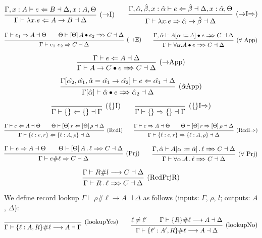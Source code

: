 \documentclass{article}
\renewcommand{\implies}{\Rightarrow}
\newcommand{\synthesizes}{\Rightarrow \!\!\! \Rightarrow}
\newcommand{\app}{\bullet}
\newcommand{\prjSymbol}{.}
\newcommand{\prj}{\,\prjSymbol\,}
\newcommand{\ev}{\hat}
\newcommand{\spc}{\qquad}
\newcommand{\apply}[1]{\left[#1\right]}
\newcommand{\synth}[4]{#1 \vdash #2 \Rightarrow #3 \dashv #4}
\renewcommand{\check}[4]{#1 \vdash #2 \Leftarrow #3 \dashv #4}
\newcommand{\presynth}[6]{#1 \vdash #2 #3 #4 \synthesizes #5 \dashv #6}
\newcommand{\lookup}[5]{#1 \vdash #2 \# #3 \longrightarrow #4 \dashv #5}
\newcommand{\deduct}[3][]
{
  \begin{prooftree}
    \hypo{#2}
    \infer1[\text{#1}]{#3}
  \end{prooftree}
}
\begin{document}
\[
  \deduct[(\(\to\)I)]
  { \check{\Gamma, x : A}{e}{B}{\Delta, x : A, \Theta} }
  { \check{\Gamma}{\lambda x. e}{A \to B}{\Delta} }
  \spc
  \deduct[(\(\to\)I\(\implies\))]
  { \check{\Gamma, \ev\alpha, \ev\beta, x : \ev\alpha}{e}{\ev\beta}{\Delta, x : \ev\alpha, \Theta} }
  { \synth{\Gamma}{\lambda x. e}{\ev\alpha \to \ev\beta}{\Delta} }
\]

\[
  \deduct[(\(\to\)E)]
  { \synth{\Gamma}{e_1}{A}{\Theta} \spc \presynth{\Theta}{\apply\Theta A}{\app}{e_2}{C}{\Delta} }
  { \synth{\Gamma}{e_1 \ e_2}{C}{\Delta}  }
  \spc
  \deduct[(\(\forall\) App)]
  { \presynth{\Gamma, \ev\alpha}{A[\alpha := \ev\alpha]}{\app}{e}{C}{\Delta} }
  { \presynth{\Gamma}{\forall \alpha. A}{\app}{e}{C}{\Delta} }
\]

\[
  \deduct[(\(\to\)App)]
    { \check{\Gamma}{e}{A}{\Delta} }
    { \presynth{\Gamma}{A \to C}{\app}{e}{C}{\Delta} }
\]

\[
  \deduct[(\(\ev\alpha\)App)]
    {
      \check{\Gamma[\ev{\alpha_2}, \ev{\alpha_1}, \ev \alpha = \ev{\alpha_1} \to
        \ev{\alpha_2}]}{e}{\ev{\alpha_1}}{\Delta}
    }
    { \presynth{\Gamma[\ev\alpha]}{\ev\alpha}{\app}{e}{\ev\alpha_2}{\Delta} }
\]


\[
\deduct[(\{\}I)]{}{\check{\Gamma}{\{\}}{\{\}}{\Gamma}}
\spc
\deduct[(\{\}I\(\implies\))]{}{\synth{\Gamma}{\{\}}{\{\}}{\Gamma}}
\]

\[
  \deduct[(RcdI)]
  { \check{\Gamma}{e}{A}{\Theta} \spc \check{\Theta}{\apply\Theta r}{\apply\Theta\rho}{\Delta} }
  { \check{\Gamma}{\{\ell : e , r \}}{\{\ell : A, \rho\}}{\Delta} }
  \spc
  \deduct[(RcdI\(\implies\))]
  { \synth{\Gamma}{e}{A}{\Theta} \spc \synth{\Theta}{\apply\Theta r}{\apply\Theta \rho}{\Delta} }
  { \synth{\Gamma}{\{\ell : e , r \}}{\{\ell : A, \rho\}}{\Delta} }
\]

\[
  \deduct[(Prj)]
  { \synth{\Gamma}{e}{A}{\Theta} \spc
    \presynth{\Theta}{\apply\Theta A}{\prj}{\ell}{C}{\Delta}
  }
  { \synth{\Gamma}{e\#\ell}{C}{\Delta} }
  \spc
  \deduct[(\(\forall\) Prj)]
  { \presynth{\Gamma, \ev\alpha}{A[\alpha := \ev\alpha]}{\prj}{\ell}{C}{\Delta} }
  { \presynth{\Gamma}{\forall \alpha. A}{\prj}{\ell}{C}{\Delta} }
\]

\[
  \deduct[(RcdPrjR)]
    { \lookup{\Gamma}{R}{l}{C}{\Delta} }
    { \presynth{\Gamma}{R}{\prj}{\ell}{C}{\Delta} }
\]

\noindent
We define record lookup $\lookup{\Gamma}{\rho}{\ell}{A}{\Delta}$ as follows (inputs: $\Gamma$, $\rho$, $l$; outputs: $A$, $\Delta$):
\[
\deduct[(lookupYes)]{}{\lookup{\Gamma}{\{\ell : A, R\}}{\ell}{A}{\Gamma}}
\spc
\deduct[(lookupNo)]
  {\ell \neq \ell' \spc \lookup{\Gamma}{\{R\}}{\ell}{A}{\Delta}}
  {\lookup{\Gamma}{\{\ell' : A', R\}}{\ell}{A}{\Delta}}
\]
\end{document}
